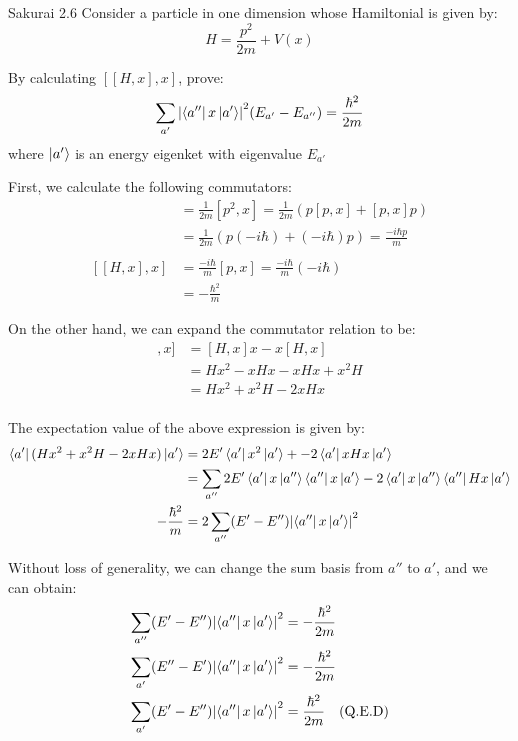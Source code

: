 \documentclass{article}
\begin{document}
\newpage
\begin{section}{Sakurai 2.6}
Consider a particle in one dimension whose Hamiltonial is given by:
$$
	H = \frac{p^2}{2m} + V(x)
$$

By calculating $[[H, x], x]$, prove:
$$
	\sum_{a'} \abs{\bra{a''} x \ket{a'}}^2 (E_{a'} - E_{a''}) = \frac{\hbar^2}{2m}
$$
where $\ket{a'}$ is an energy eigenket with eigenvalue $E_{a'}$

\begin{tcolorbox}[breakable]
	First, we calculate the following commutators:
	\begin{align*}
		[H,x]     & = \frac{1}{2m} [p^2, x] = \frac{1}{2m} (p[p, x] + [p, x] p)       \\
		          & = \frac{1}{2m} (p (-i\hbar) + (-i \hbar) p) = \frac{-i\hbar p}{m} \\
		\\
		[[H,x],x] & = \frac{-i \hbar}{m} [p, x] = \frac{-i \hbar}{m} (-i \hbar)       \\
		          & = -\frac{\hbar^2}{m}
	\end{align*}

	On the other hand, we can expand the commutator relation to be:
	\begin{align*}
		[[H,x], x] & = [H,x] x - x [H ,x]       \\
		           & = Hx^2 - xHx - xHx + x^2 H \\
		           & = H x^2 + x^2 H - 2xHx     \\
	\end{align*}

	The expectation value of the above expression is given by:
	\begin{align*}
		\bra{a'} (H x^2 + x^2 H - 2xHx) \ket{a'}
		                   & = 2E' \bra{a'} x^2 \ket{a'} +- 2 \bra{a'} x  H  x \ket{a'}                                                 \\
		                   & = \sum_{a''} 2E' \bra{a'} x \ket{a''} \bra{a''} x \ket{a'} - 2 \bra{a'} x \ket{a''} \bra{a''} H x \ket{a'} \\
		-\frac{\hbar^2}{m} & = 2 \sum_{a''} (E' - E'')  \abs{\bra{a''} x \ket{a'}}^2
	\end{align*}

	Without loss of generality, we can change the sum basis from $a''$ to $a'$, and we can obtain:
	\begin{align*}
		\sum_{a''} (E' - E'')  \abs{\bra{a''} x \ket{a'}}^2 & = -\frac{\hbar^2}{2m}     \\
		\sum_{a'} (E'' - E')  \abs{\bra{a''} x \ket{a'}}^2  & = -\frac{\hbar^2}{2m}     \\
		\sum_{a'} (E' - E'')  \abs{\bra{a''} x \ket{a'}}^2  & = \frac{\hbar^2}{2m} \quad \text{(Q.E.D)}
	\end{align*}
\end{tcolorbox}
\end{section}
\end{document}
